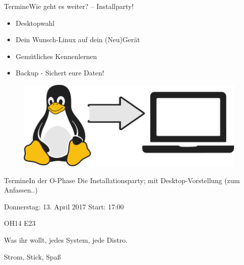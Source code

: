 % 

\begin{frame}{Termine}{Wie geht es weiter?  – Installparty!}
 \begin{itemize}
  \item Desktopwahl
  \item Dein Wunsch-Linux auf dein (Neu)Gerät
  \item Gemütliches Kennenlernen
  \item Backup - Sichert eure Daten!
 \end{itemize}
 \begin{figure}
 \includegraphics[height=0.4\textheight]{resources/tux2laptop.png}
 \end{figure}
 
\end{frame}


\begin{frame}{Termine}{In der O-Phase}
	Die Installationsparty;
	mit Desktop-Vorstellung (zum Anfassen..)
	\begin{center}
	\begin{description}[<+->]
		\item[Wann?] Donnerstag: 13. April 2017 Start: 17:00
		\item[Wo?] OH14 E23
		\item[Was?] Was ihr wollt, jedes System, jede Distro.
		\item[Womit?] Strom, Stick, Spaß    
		
	\end{description}
	\end{center}
\begin{center}
\end{center}

\end{frame}

